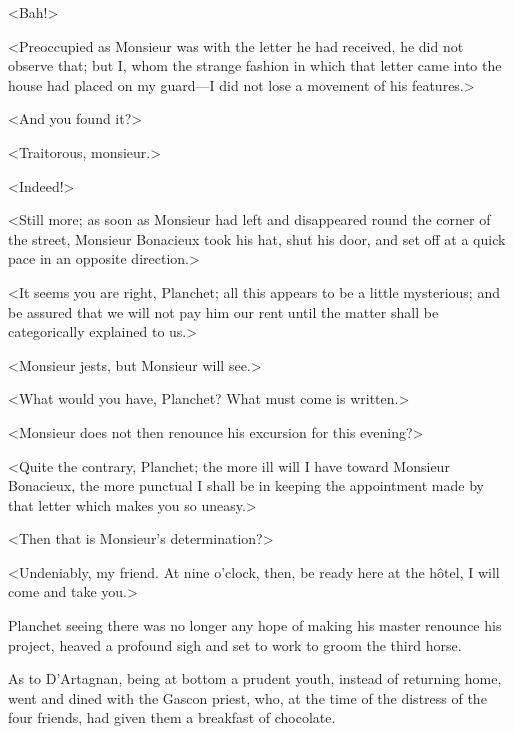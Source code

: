 <Bah!> 

<Preoccupied as Monsieur was with the letter he had received, he did not observe that; but I, whom the strange fashion in which that letter came into the house had placed on my guard—I did not lose a movement of his features.> 

<And you found it?> 

<Traitorous, monsieur.> 

<Indeed!> 

<Still more; as soon as Monsieur had left and disappeared round the corner of the street, Monsieur Bonacieux took his hat, shut his door, and set off at a quick pace in an opposite direction.> 

<It seems you are right, Planchet; all this appears to be a little mysterious; and be assured that we will not pay him our rent until the matter shall be categorically explained to us.> 

<Monsieur jests, but Monsieur will see.> 

<What would you have, Planchet? What must come is written.> 

<Monsieur does not then renounce his excursion for this evening?> 

<Quite the contrary, Planchet; the more ill will I have toward Monsieur Bonacieux, the more punctual I shall be in keeping the appointment made by that letter which makes you so uneasy.> 

<Then that is Monsieur's determination?> 

<Undeniably, my friend. At nine o'clock, then, be ready here at the hôtel, I will come and take you.> 

Planchet seeing there was no longer any hope of making his master renounce his project, heaved a profound sigh and set to work to groom the third horse. 

As to D'Artagnan, being at bottom a prudent youth, instead of returning home, went and dined with the Gascon priest, who, at the time of the distress of the four friends, had given them a breakfast of chocolate. 

